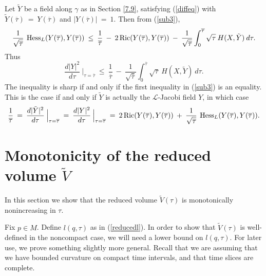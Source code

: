 Let $\tilde{Y}$ be a field along $\gamma$ as in Section \ref{7.9},
satisfying (\ref{diffeq}) with $\tilde{Y}(\overline{\tau}) \: = \:
{Y}(\overline{\tau})$ and $|{Y}(\overline{\tau})| \: = \: 1$.
Then from (\ref{sub3}),
\begin{equation}
\frac{1}{\sqrt{\overline{\tau}}} \:
\operatorname{Hess}_L(Y(\overline{\tau}), Y(\overline{\tau})) \: \le \:
\frac{1}{\overline{\tau}} \: - \:
2 \operatorname{Ric}(Y(\overline{\tau}),Y(\overline{\tau})) \: - \:
\frac{1}{\sqrt{\overline{\tau}}} \int_0^{\overline{\tau}}
\sqrt{\tau} \: H(X, \tilde{Y}) \: d\tau.
\end{equation}
Thus
\begin{equation} \label{dY}
\frac{d |Y|^2}{d\tau} \: \Big|_{\tau = \overline{\tau}} \: \le \:
\frac{1}{\overline{\tau}} \: - \:
\frac{1}{\sqrt{\overline{\tau}}} \int_0^{\overline{\tau}}
\sqrt{\tau} \: H(X, \tilde{Y}) \: d\tau.
\end{equation}
The inequality is sharp if and only if the first inequality in
(\ref{sub3}) is an equality.
This is the case if and only if $\tilde{Y}$ is actually the
${\mathcal L}$-Jacobi field $Y$, in which case
\begin{equation} \label{sharp}
\frac{1}{\overline{\tau}} \: = \:
\frac{d |\tilde{Y}|^2}{d\tau} \: \Big|_{\tau = \overline{\tau}} \: = \:
\frac{d |Y|^2}{d\tau} \: \Big|_{\tau = \overline{\tau}}
\: = \:
2 \operatorname{Ric}(Y(\overline{\tau}),Y(\overline{\tau})) \: + \:
\frac{1}{\sqrt{\overline{\tau}}} \:
\operatorname{Hess}_L(Y(\overline{\tau}), Y(\overline{\tau})).
\end{equation}

\section{Monotonicity of
the reduced volume $\widetilde{V}$} \label{monoV}

In this section we show that the reduced volume $\widetilde{V}(\tau)$ is
monotonically nonincreasing in $\tau$.


Fix $p \in M$. Define $l(q, \tau)$
as in (\ref{reducedl}). In order to show that
$\tilde{V}(\tau)$ is well-defined in the noncompact case,
we will need a lower bound on $l(q, \tau)$. For later
use, we prove something slightly more general. Recall
that we are assuming that we have bounded curvature on
compact time intervals,
and that time slices are complete.

